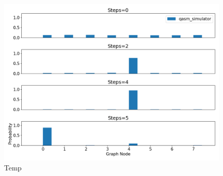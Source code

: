 \documentclass[../../dissertation.tex]{subfiles}
\begin{document}
\begin{figure}[!h]
	\centering
	\includegraphics[scale=0.40]{img/Qiskit/CoinedQuantumWalk/Search/CoinedQiskitSearch_N3_M4_S0245}
	\caption{Temp } 
	\label{fig:coinedSearchQiskitDist}
\end{figure}

\end{document}
